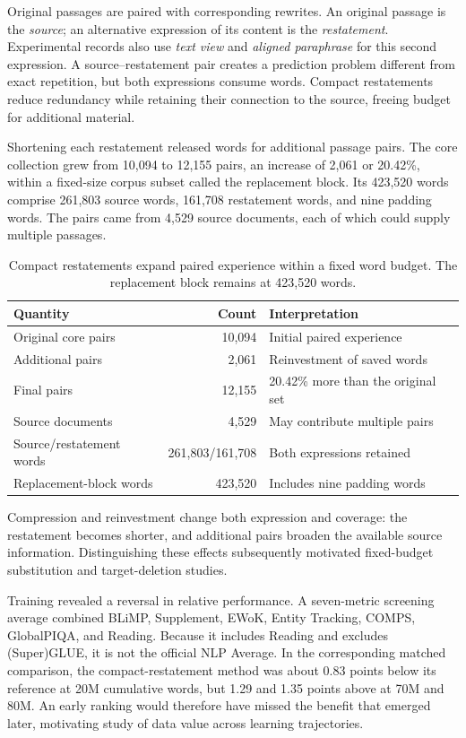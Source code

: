 Original passages are paired with corresponding rewrites. An original passage is the \emph{source}; an alternative expression of its content is the \emph{restatement}. Experimental records also use \emph{text view} and \emph{aligned paraphrase} for this second expression. A source--restatement pair creates a prediction problem different from exact repetition, but both expressions consume words. Compact restatements reduce redundancy while retaining their connection to the source, freeing budget for additional material.

Shortening each restatement released words for additional passage pairs. The core collection grew from 10,094 to 12,155 pairs, an increase of 2,061 or 20.42\%, within a fixed-size corpus subset called the replacement block. Its 423,520 words comprise 261,803 source words, 161,708 restatement words, and nine padding words. The pairs came from 4,529 source documents, each of which could supply multiple passages.

\begin{table}[htbp]
\caption{Compact restatements expand paired experience within a fixed word budget. The replacement block remains at 423,520 words.}
\label{tab:compact}
\small
\begin{tabularx}{\linewidth}{@{}Y r Y@{}}
\toprule Quantity & Count & Interpretation\\\midrule
Original core pairs & 10,094 & Initial paired experience\\
Additional pairs & 2,061 & Reinvestment of saved words\\
Final pairs & 12,155 & 20.42\% more than the original set\\
Source documents & 4,529 & May contribute multiple pairs\\
Source/restatement words & 261,803/161,708 & Both expressions retained\\
Replacement-block words & 423,520 & Includes nine padding words\\
\bottomrule
\end{tabularx}
\end{table}

Compression and reinvestment change both expression and coverage: the restatement becomes shorter, and additional pairs broaden the available source information. Distinguishing these effects subsequently motivated fixed-budget substitution and target-deletion studies.

Training revealed a reversal in relative performance. A seven-metric screening average combined BLiMP, Supplement, EWoK, Entity Tracking, COMPS, GlobalPIQA, and Reading. Because it includes Reading and excludes (Super)GLUE, it is not the official NLP Average. In the corresponding matched comparison, the compact-restatement method was about 0.83 points below its reference at 20M cumulative words, but 1.29 and 1.35 points above at 70M and 80M. An early ranking would therefore have missed the benefit that emerged later, motivating study of data value across learning trajectories.

